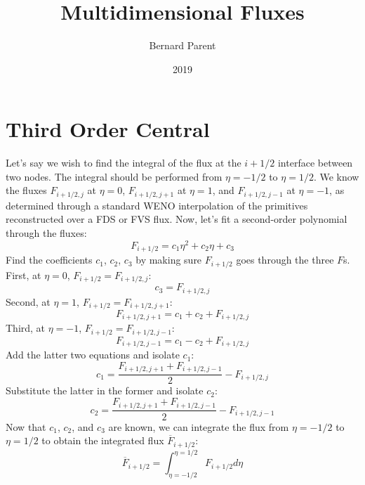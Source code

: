 \documentclass{warpdoc}
\author{
  Bernard Parent
}
\title{
  Multidimensional Fluxes
}
\date{
  2019
}
\begin{document}
  \pagestyle{headings}
  \setcounter{page}{1}
  \makewarpdoctitle
  \tableofcontents


\section{Third Order Central}

Let's say we wish to find the integral of the flux at the $i+1/2$ interface between two nodes. The integral should be performed from $\eta=-1/2$ to $\eta=1/2$. We know the fluxes $F_{i+1/2,j}$ at $\eta=0$, $F_{i+1/2,j+1}$ at $\eta=1$, and $F_{i+1/2,j-1}$ at $\eta=-1$, as determined through a standard WENO interpolation \cite{jcp:1994:liu}
 of the primitives reconstructed over a FDS \cite{jcp:1981:roe} or FVS flux. Now, let's fit a second-order polynomial through the fluxes:
%
\begin{equation}
F_{i+1/2}=c_1 \eta^2 + c_2 \eta + c_3 
\end{equation}
% 
Find the coefficients $c_1$, $c_2$, $c_3$ by making sure $F_{i+1/2}$ goes through the three $F$s. First, at $\eta=0$, $F_{i+1/2}=F_{i+1/2,j}$:
%
\begin{equation}
c_3=F_{i+1/2,j}
\end{equation}
%
Second, at $\eta=1$, $F_{i+1/2}=F_{i+1/2,j+1}$:
%
\begin{equation}
F_{i+1/2,j+1}=c_1  + c_2  + F_{i+1/2,j} 
\end{equation}
% 
Third, at $\eta=-1$, $F_{i+1/2}=F_{i+1/2,j-1}$:
%
\begin{equation}
F_{i+1/2,j-1}=c_1  - c_2  + F_{i+1/2,j} 
\end{equation}
% 
Add the latter two equations and isolate $c_1$:
%
\begin{equation}
c_1=\frac{F_{i+1/2,j+1}+F_{i+1/2,j-1}}{2}- F_{i+1/2,j} 
\end{equation}
% 
Substitute the latter in the former and isolate $c_2$:
%
\begin{equation}
c_2=\frac{F_{i+1/2,j+1}+F_{i+1/2,j-1}}{2} -F_{i+1/2,j-1}
\end{equation}
% 
Now that $c_1$, $c_2$, and $c_3$ are known, we can integrate the flux from $\eta=-1/2$ to $\eta=1/2$ to obtain the integrated flux $\overline{F}_{i+1/2}$:
%
\begin{equation}
\overline{F}_{i+1/2}=\int_{\eta=-1/2}^{\eta=1/2} F_{i+1/2} d\eta
\end{equation}
\end{document}
